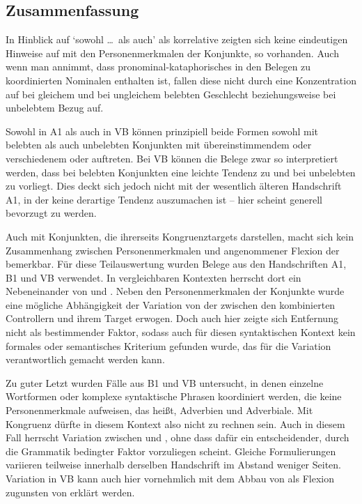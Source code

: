 
\subsection{Zusammenfassung}

In Hinblick auf  `sowohl \dots\ als auch' als
korrelative  zeigten sich keine eindeutigen
Hinweise auf  mit den Personenmerkmalen der
Konjunkte, so vorhanden. Auch wenn man annimmt, dass
pronominal-kataphorisches  in den Belegen zu
koordinierten Nominalen enthalten ist, fallen diese nicht
durch eine Konzentration auf  bei gleichem und  bei
ungleichem belebten Geschlecht beziehungsweise bei
unbelebtem Bezug auf.

Sowohl in A1 als auch in VB können prinzipiell beide Formen sowohl mit
belebten als auch unbelebten Konjunkten mit
über\-einstim\-mendem oder verschiedenem  oder 
auftreten. Bei VB können die Belege zwar so interpretiert werden, dass bei
belebten Konjunkten eine leichte Tendenz zu  und bei unbelebten zu
 vorliegt. Dies deckt sich jedoch nicht mit der
wesentlich älteren Handschrift A1, in der keine derartige Tendenz auszumachen
ist -- hier scheint generell  bevorzugt zu werden.

Auch mit Konjunkten, die ihrerseits Kongruenztargets darstellen,
macht sich kein Zusammen\-hang zwischen Personen\-merkmalen
und angenommener Flexion der  bemerkbar. Für diese
Teilauswertung wurden Belege aus den Handschriften A1, B1 und VB verwendet. In
vergleichbaren Kontexten herrscht dort ein Nebeneinander von  und
. Neben den Personenmerkmalen der Konjunkte wurde eine mögliche
Abhängigkeit der Variation von der  zwischen den kombinierten
Controllern und ihrem Target erwogen. Doch auch hier zeigte sich
Entfernung nicht als bestimmender Faktor, sodass auch für diesen syntaktischen
Kontext kein formales oder semantisches Kriterium gefunden wurde, das für die
Variation verantwortlich gemacht werden kann.

Zu guter Letzt wurden Fälle aus B1 und VB untersucht, in denen einzelne
Wortformen oder komplexe syntaktische Phrasen koordiniert
werden, die keine Personenmerkmale aufweisen, das heißt,
Adverbien und Adverbiale. Mit Kongruenz dürfte in
diesem Kontext also nicht zu rechnen sein. Auch in diesem Fall herrscht
Variation zwischen  und , ohne dass dafür ein
entscheidender, durch die Grammatik bedingter Faktor vorzuliegen scheint.
Gleiche Formulierungen variieren teilweise innerhalb derselben Handschrift im
Abstand weniger Seiten. Variation in VB kann auch hier vornehmlich mit dem
Abbau von  als Flexion zugunsten von  erklärt werden.
